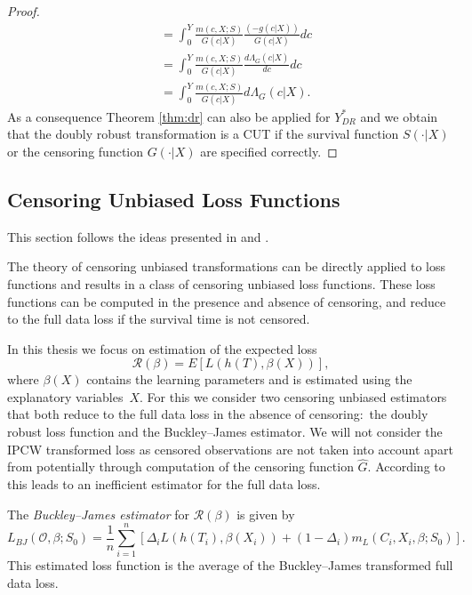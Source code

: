 \documentclass[12pt, a4paper]{scrartcl}
\theoremstyle{definition}
\theoremstyle{plain}
\numberwithin{equation}{section}
\numberwithin{figure}{section}
\numberwithin{table}{section}
\begin{document}
\begin{proof}
\begin{equation*}
\begin{split}
		& ={} \int_{0}^{Y}\frac{m(c,X;S)}{G(c\vert X)}\frac{(-g(c\vert X))}{G(c\vert X)}dc\\
		&={} \int_{0}^{Y}\frac{m(c,X;S)}{G(c\vert X)}\frac{d\Lambda_G(c \vert X)}{dc}dc\\
		&={} \int_{0}^{Y}\frac{m(c,X;S)}{G(c\vert X)}d\Lambda_G(c \vert X).
		\end{split}
		\end{equation*}
		As a consequence Theorem \ref{thm:dr} can also be applied for $Y_{DR}^*$ and we obtain that the doubly robust transformation is a CUT if the survival function $S(\cdot\vert X)$ or the censoring function $G(\cdot\vert X)$ are specified correctly.
	\end{proof}

	\subsection{Censoring Unbiased Loss Functions}\label{sec:cudls}
	This section follows the ideas presented in \citet*{culs} and \citet*{basearticle}.
	
	The theory of censoring unbiased transformations can be directly applied to loss functions and results in a class of censoring unbiased loss functions. 
	These loss functions can be computed in the presence and absence of censoring, and reduce to the full data loss if the survival time is not censored.
	
	In this thesis we focus on estimation of the expected loss $$\mathcal{R} (\beta) = E[L(h(T),\beta(X))],$$ where $\beta(X)$ contains the learning parameters and is estimated using the explanatory variables~$X$.
	For this we consider two censoring unbiased estimators that both reduce to the full data loss in the absence of censoring:~the doubly robust loss function and the Buckley--James estimator.
	We will not consider the IPCW transformed loss as censored observations are not taken into account apart from potentially through computation of the censoring function $\hat{G}$.
	According to \citet*{basearticle-arxiv} this leads to an inefficient estimator for the full data loss.
	
	The \emph{Buckley--James estimator} for $\mathcal{R}(\beta)$ is given by
	\begin{equation}\label{eq:bj}
	L_{BJ}(\mathcal{O}, \beta; S_0) = \frac{1}{n} \sum_{i=1}^n \left[ \Delta_i L(h(T_i), \beta(X_i))+(1-\Delta_i)m_L(C_i, X_i, \beta; S_0)\right].
	\end{equation}
	This estimated loss function is the average of the Buckley--James transformed full data loss.
	
\end{document}
